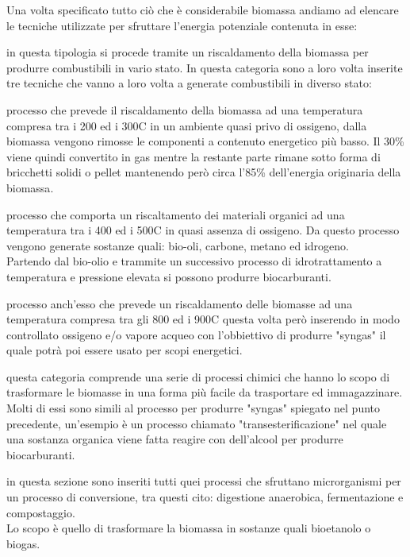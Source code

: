 \vspace{2mm}
Una volta specificato tutto ciò che è considerabile biomassa andiamo ad elencare le tecniche utilizzate per sfruttare l'energia potenziale contenuta in esse\cite{EIA2022}:
\begin{description}[labelindent=5mm]
    \item[$\bullet$ Conversione termica] in questa tipologia si procede tramite un riscaldamento della biomassa per produrre combustibili in vario stato. In questa categoria sono a loro volta inserite tre tecniche che vanno a loro volta a generate combustibili in diverso stato:
    \begin{description}[labelindent=5mm]
        \item[$\cdot$ Torrefazione:] processo che prevede il riscaldamento della biomassa ad una temperatura compresa tra i 200 ed i 300\degree C in un ambiente quasi privo di ossigeno, dalla biomassa vengono rimosse le componenti a contenuto energetico più basso. Il 30\% viene quindi convertito in gas mentre la restante parte rimane sotto forma di bricchetti solidi o pellet mantenendo però circa l'85\% dell'energia originaria della biomassa\cite{Torrification}. 
        \item[$\cdot$ Pirolisi:] processo che comporta un riscaltamento dei materiali organici ad una temperatura tra i 400 ed i 500\degree C in quasi assenza di ossigeno. Da questo processo vengono generate sostanze quali: bio-oli, carbone, metano ed idrogeno.\\
        Partendo dal bio-olio e trammite un successivo processo di idrotrattamento a temperatura e pressione elevata si possono produrre biocarburanti\cite{EIA2021}.
        \item[$\cdot$ Gassificazione:] processo anch'esso che prevede un riscaldamento delle biomasse ad una temperatura compresa tra gli 800 ed i 900\degree C questa volta però inserendo in modo controllato ossigeno e/o vapore acqueo con l'obbiettivo di produrre "syngas" il quale potrà poi essere usato per scopi energetici.\cite{EIA2022}
    \end{description}
    \item[$\bullet$ Conversione chimica] questa categoria comprende una serie di processi chimici che hanno lo scopo di trasformare le biomasse in una forma più facile da trasportare ed immagazzinare.\\
    Molti di essi sono simili al processo per produrre "syngas" spiegato nel punto precedente, un'esempio è un processo chiamato "transesterificazione" nel quale una sostanza organica viene fatta reagire con dell'alcool per produrre biocarburanti.\cite{EIA2022}
    \item[$\bullet$ Conversione biologica] in questa sezione sono inseriti tutti quei processi che sfruttano microrganismi per un processo di conversione, tra questi cito: digestione anaerobica, fermentazione e compostaggio.\\ Lo scopo è quello di trasformare la biomassa in sostanze quali bioetanolo o biogas. 
\end{description}
\newpage
